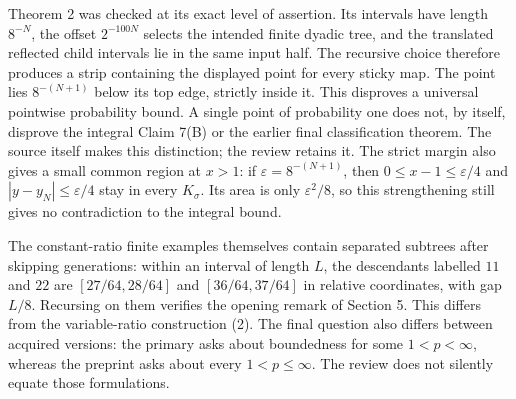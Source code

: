 \documentclass[10pt]{article}
\begin{document}
Theorem 2 was checked at its exact level of assertion. Its intervals have length \(8^{-N}\), the offset \(2^{-100N}\) selects the intended finite dyadic tree, and the translated reflected child intervals lie in the same input half. The recursive choice therefore produces a strip containing the displayed point for every sticky map. The point lies \(8^{-(N+1)}\) below its top edge, strictly inside it. This disproves a universal pointwise probability bound. A single point of probability one does not, by itself, disprove the integral Claim 7(B) or the earlier final classification theorem. The source itself makes this distinction; the review retains it. The strict margin also gives a small common region at \(x>1\): if \(\varepsilon=8^{-(N+1)}\), then \(0\le x-1\le\varepsilon/4\) and \(|y-y_N|\le\varepsilon/4\) stay in every \(K_\sigma\). Its area is only \(\varepsilon^2/8\), so this strengthening still gives no contradiction to the integral bound.\par
The constant-ratio finite examples themselves contain separated subtrees after skipping generations: within an interval of length \(L\), the descendants labelled \(11\) and \(22\) are \([27/64,28/64]\) and \([36/64,37/64]\) in relative coordinates, with gap \(L/8\). Recursing on them verifies the opening remark of Section 5. This differs from the variable-ratio construction (2). The final question also differs between acquired versions: the primary asks about boundedness for some \(1<p<\infty\), whereas the preprint asks about every \(1<p\le\infty\). The review does not silently equate those formulations.\par
\end{document}

